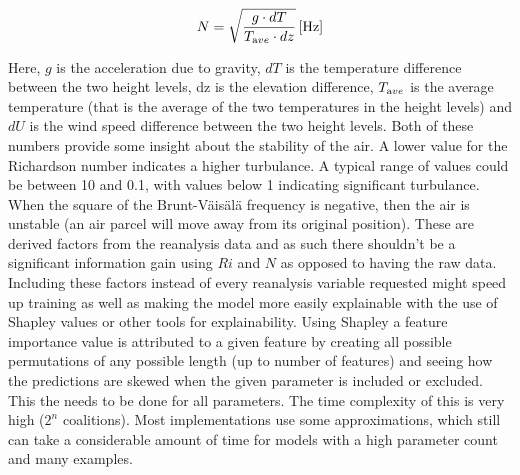 \begin{equation}
    \label{eqn:N}
    N = \sqrt{\frac{g \cdot dT }{T_{\textrm ave} \cdot dz}} \, \mathrm{[Hz]}
\end{equation}

Here, $g$ is the acceleration due to gravity, $dT$ is the temperature difference between the two height levels, dz is the elevation difference, $T_{\textrm ave}$ is the average temperature (that is the average of the two temperatures in the height levels) and $dU$ is the wind speed difference between the two height levels. Both of these numbers provide some insight about the stability of the air. A lower value for the Richardson number indicates a higher turbulance. A typical range of values could be between 10 and 0.1, with values below 1 indicating significant turbulance\cite{richardson_number_skybrary}. When the square of the Brunt-Väisälä frequency is negative, then the air is unstable (an air parcel will move away from its original position)\cite{brunt_vaisala_freq_eumtrain}. These are derived factors from the reanalysis data and as such there shouldn't be a significant information gain using $Ri$ and $N$ as opposed to having the raw data. Including these factors instead of every reanalysis variable requested might speed up training as well as making the model more easily explainable with the use of Shapley values or other tools for explainability. Using Shapley a feature importance value is attributed to a given feature by creating all possible permutations of any possible length (up to number of features) and seeing how the predictions are skewed when the given parameter is included or excluded. This the needs to be done for all parameters. The time complexity of this is very high ($2^n$ coalitions)\cite{shapley_information}. Most implementations use some approximations, which still can take a considerable amount of time for models with a high parameter count and many examples.

